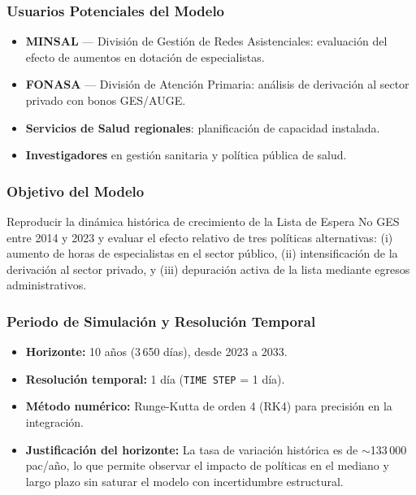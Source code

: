 \documentclass[12pt,a4paper]{article}
\begin{document}
\subsubsection*{Usuarios Potenciales del Modelo}

\begin{itemize}[leftmargin=1.5cm]
  \item \textbf{MINSAL} — División de Gestión de Redes Asistenciales: evaluación del efecto de aumentos en dotación de especialistas.
  \item \textbf{FONASA} — División de Atención Primaria: análisis de derivación al sector privado con bonos GES/AUGE.
  \item \textbf{Servicios de Salud regionales}: planificación de capacidad instalada.
  \item \textbf{Investigadores} en gestión sanitaria y política pública de salud.
\end{itemize}

\subsubsection*{Objetivo del Modelo}

Reproducir la dinámica histórica de crecimiento de la Lista de Espera No GES entre 2014 y 2023 y evaluar el efecto relativo de tres políticas alternativas: (i) aumento de horas de especialistas en el sector público, (ii) intensificación de la derivación al sector privado, y (iii) depuración activa de la lista mediante egresos administrativos.

\subsubsection*{Periodo de Simulación y Resolución Temporal}

\begin{itemize}[leftmargin=1.5cm]
  \item \textbf{Horizonte:} 10 años (3\,650 días), desde 2023 a 2033.
  \item \textbf{Resolución temporal:} 1 día (\texttt{TIME STEP} = 1 día).
  \item \textbf{Método numérico:} Runge-Kutta de orden 4 (RK4) para precisión en la integración.
  \item \textbf{Justificación del horizonte:} La tasa de variación histórica es de $\sim$133\,000 pac/año, lo que permite observar el impacto de políticas en el mediano y largo plazo sin saturar el modelo con incertidumbre estructural.
\end{itemize}
\end{document}
